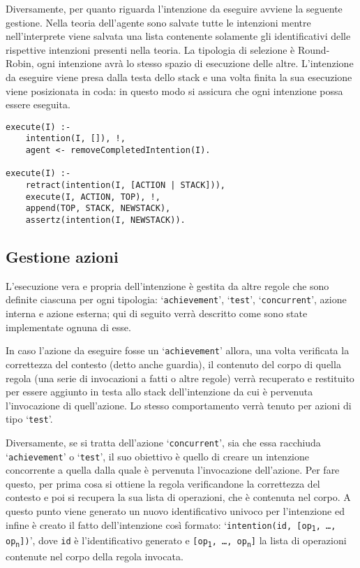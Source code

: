 Diversamente, per quanto riguarda l'intenzione da eseguire avviene la seguente gestione.
Nella teoria dell'agente sono salvate tutte le intenzioni mentre nell'interprete viene salvata una lista contenente solamente gli identificativi delle rispettive intenzioni presenti nella teoria. La tipologia di selezione è Round-Robin, ogni intenzione avrà lo stesso spazio di esecuzione delle altre. L'intenzione da eseguire viene presa dalla testa dello stack e una volta finita la sua esecuzione viene posizionata in coda: in questo modo si assicura che ogni intenzione possa essere eseguita.

\switchToProlog{}
\begin{lstlisting}[float, firstnumber=1,label={lst:ImplementazioneRegoleInvocazioneEsecuzioneIntenzione},caption={Implementazione regole per invocazione esecuzione di un'intenzione}]
execute(I) :-
    intention(I, []), !,
    agent <- removeCompletedIntention(I).

execute(I) :-
    retract(intention(I, [ACTION | STACK])),
    execute(I, ACTION, TOP), !,
    append(TOP, STACK, NEWSTACK),
    assertz(intention(I, NEWSTACK)).
\end{lstlisting}

\subsection{Gestione azioni}\label{sctn:GestioneAzioni}
L'esecuzione vera e propria dell'intenzione è gestita da altre regole che sono definite ciascuna per ogni tipologia: `\texttt{achievement}', `\texttt{test}', `\texttt{concurrent}', azione interna e azione esterna; qui di seguito verrà descritto come sono state implementate ognuna di esse.

In caso l'azione da eseguire fosse un `\texttt{achievement}' allora, una volta verificata la correttezza del contesto (detto anche guardia), il contenuto del corpo di quella regola (una serie di invocazioni a fatti o altre regole) verrà recuperato e restituito per essere aggiunto in testa allo stack dell'intenzione da cui è pervenuta l'invocazione di quell'azione. Lo stesso comportamento verrà tenuto per azioni di tipo `\texttt{test}'.

Diversamente, se si tratta dell'azione `\texttt{concurrent}', sia che essa racchiuda \allowbreak `\texttt{achieve\-ment}' o `\texttt{test}', il suo obiettivo è quello di creare un intenzione concorrente a quella dalla quale è pervenuta l'invocazione dell'azione. Per fare questo, per prima cosa si ottiene la regola verificandone la correttezza del contesto e poi si recupera la sua lista di operazioni, che è contenuta nel corpo.
A questo punto viene generato un nuovo identificativo univoco per l'intenzione ed infine è creato il fatto dell'intenzione così formato: `\texttt{intention(id, [op\textsubscript{1}, \ldots, op\textsubscript{n}])}', dove \texttt{id} è l'identificativo generato e \texttt{[op\textsubscript{1}, \ldots, op\textsubscript{n}]} la lista di operazioni contenute nel corpo della regola invocata.

